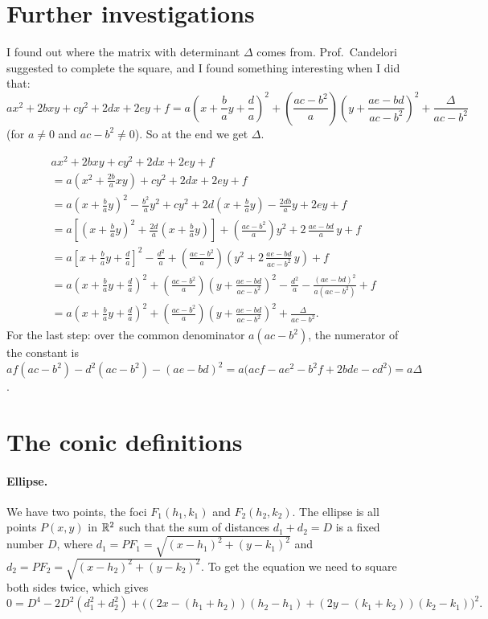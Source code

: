 \section{Further investigations}

I found out where the matrix with determinant $\Delta$ comes from. Prof.~Candelori suggested to complete the square, and I found something interesting when I did that:
\[
ax^2 + 2bxy + cy^2 + 2dx + 2ey + f
= a\left(x + \frac{b}{a}y + \frac{d}{a}\right)^2 + \left(\frac{ac - b^2}{a}\right)\left(y + \frac{ae - bd}{ac - b^2}\right)^2 + \frac{\Delta}{ac - b^2}
\]
(for $a \neq 0$ and $ac - b^2 \neq 0$). So at the end we get $\Delta$.

\begin{calc}
\[
\begin{aligned}
&ax^2 + 2bxy + cy^2 + 2dx + 2ey + f \\
&= a\left(x^2 + \frac{2b}{a}xy\right) + cy^2 + 2dx + 2ey + f \\
&= a\left(x + \frac{b}{a}y\right)^2 - \frac{b^2}{a}y^2 + cy^2 + 2d\left(x + \frac{b}{a}y\right) - \frac{2db}{a}y + 2ey + f \\
&= a\left[\left(x + \frac{b}{a}y\right)^2 + \frac{2d}{a}\left(x + \frac{b}{a}y\right)\right] + \left(\frac{ac - b^2}{a}\right)y^2 + 2\,\frac{ae - bd}{a}\,y + f \\
&= a\left[x + \frac{b}{a}y + \frac{d}{a}\right]^2 - \frac{d^2}{a} + \left(\frac{ac - b^2}{a}\right)\left(y^2 + 2\,\frac{ae - bd}{ac - b^2}\,y\right) + f \\
&= a\left(x + \frac{b}{a}y + \frac{d}{a}\right)^2 + \left(\frac{ac - b^2}{a}\right)\left(y + \frac{ae - bd}{ac - b^2}\right)^2 - \frac{d^2}{a} - \frac{(ae - bd)^2}{a(ac - b^2)} + f \\
&= a\left(x + \frac{b}{a}y + \frac{d}{a}\right)^2 + \left(\frac{ac - b^2}{a}\right)\left(y + \frac{ae - bd}{ac - b^2}\right)^2 + \frac{\Delta}{ac - b^2}.
\end{aligned}
\]
For the last step: over the common denominator $a(ac - b^2)$, the numerator of the constant is
$af(ac - b^2) - d^2(ac - b^2) - (ae - bd)^2 = a\big(acf - ae^2 - b^2 f + 2bde - cd^2\big) = a\Delta$.
\end{calc}

\section{The conic definitions}

\paragraph{Ellipse.} We have two points, the foci $F_1(h_1,k_1)$ and $F_2(h_2,k_2)$. The ellipse is all points $P(x,y)$ in $\mathbb{R}^2$ such that the sum of distances $d_1 + d_2 = D$ is a fixed number $D$, where $d_1 = PF_1 = \sqrt{(x-h_1)^2 + (y-k_1)^2}$ and $d_2 = PF_2 = \sqrt{(x-h_2)^2 + (y-k_2)^2}$. To get the equation we need to square both sides twice, which gives
\[
0 = D^4 - 2D^2(d_1^2 + d_2^2) + \big((2x - (h_1 + h_2))(h_2 - h_1) + (2y - (k_1 + k_2))(k_2 - k_1)\big)^2 .
\]

